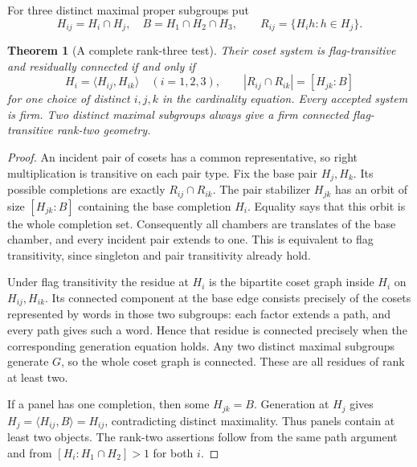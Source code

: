 \documentclass[11pt,a4paper]{article}
\newtheorem{theorem}{Theorem}\newtheorem{lemma}[theorem]{Lemma}\newtheorem{proposition}[theorem]{Proposition}
\begin{document}
For three distinct maximal proper subgroups put
\[
 H_{ij}=H_i\cap H_j,\quad B=H_1\cap H_2\cap H_3,\qquad
 R_{ij}=\{H_i h:h\in H_j\}.
\]
\begin{theorem}[A complete rank-three test]\label{thm:test}
Their coset system is flag-transitive and residually connected if and only if
\begin{equation}\label{eq:test}
 H_i=\langle H_{ij},H_{ik}\rangle\quad(i=1,2,3),\qquad
 |R_{ij}\cap R_{ik}|=[H_{jk}:B]
\end{equation}
for one choice of distinct $i,j,k$ in the cardinality equation. Every accepted system is firm. Two distinct maximal subgroups always give a firm connected flag-transitive rank-two geometry.
\end{theorem}
\begin{proof}
An incident pair of cosets has a common representative, so right multiplication is transitive on each pair type. Fix the base pair $H_j,H_k$. Its possible completions are exactly $R_{ij}\cap R_{ik}$. The pair stabilizer $H_{jk}$ has an orbit of size $[H_{jk}:B]$ containing the base completion $H_i$. Equality says that this orbit is the whole completion set. Consequently all chambers are translates of the base chamber, and every incident pair extends to one. This is equivalent to flag transitivity, since singleton and pair transitivity already hold.

Under flag transitivity the residue at $H_i$ is the bipartite coset graph inside $H_i$ on $H_{ij},H_{ik}$. Its connected component at the base edge consists precisely of the cosets represented by words in those two subgroups: each factor extends a path, and every path gives such a word. Hence that residue is connected precisely when the corresponding generation equation holds. Any two distinct maximal subgroups generate $G$, so the whole coset graph is connected. These are all residues of rank at least two.

If a panel has one completion, then some $H_{jk}=B$. Generation at $H_j$ gives $H_j=\langle H_{ij},B\rangle=H_{ij}$, contradicting distinct maximality. Thus panels contain at least two objects. The rank-two assertions follow from the same path argument and from $[H_i:H_1\cap H_2]>1$ for both $i$.
\end{proof}
\end{document}
